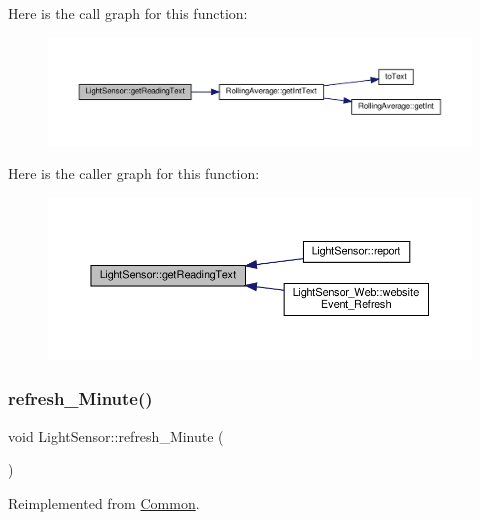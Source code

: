 Here is the call graph for this function\+:
\nopagebreak
\begin{figure}[H]
\begin{center}
\leavevmode
\includegraphics[width=350pt]{class_light_sensor_af38ae75a6739383e1590548fdb07e353_cgraph}
\end{center}
\end{figure}
Here is the caller graph for this function\+:
\nopagebreak
\begin{figure}[H]
\begin{center}
\leavevmode
\includegraphics[width=350pt]{class_light_sensor_af38ae75a6739383e1590548fdb07e353_icgraph}
\end{center}
\end{figure}
\mbox{\label{class_light_sensor_aa6c29591860ab05672a183bc32fce6f4}} 
\subsubsection{\texorpdfstring{refresh\+\_\+\+Minute()}{refresh\_Minute()}\hspace{0.1cm}{\footnotesize\ttfamily [1/2]}}
{\footnotesize\ttfamily void Light\+Sensor\+::refresh\+\_\+\+Minute (\begin{DoxyParamCaption}{ }\end{DoxyParamCaption})\hspace{0.3cm}{\ttfamily [virtual]}}



Reimplemented from \hyperlink{class_common_a14e4462a94bd118028ce1d487ca0292c}{Common}.

